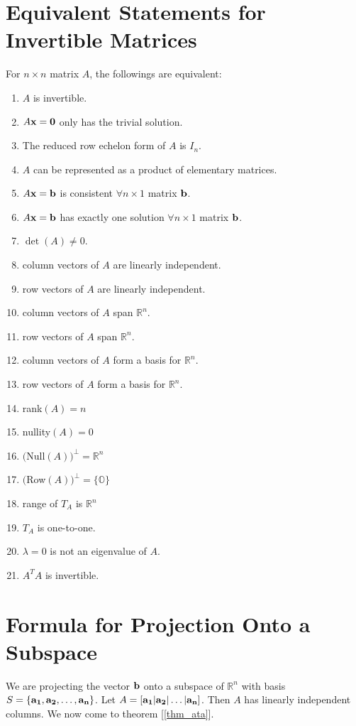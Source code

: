 

    \section{Equivalent Statements for Invertible Matrices}\label{equiv_invert}
    		For $n \times n$ matrix $A$, the followings are equivalent:
        \begin{enumerate}[label=(\alph*)]
        	\item $A$ is invertible.
        	\item $A\bf{x}=\bf{0}$ only has the trivial solution.
        	\item The reduced row echelon form of $A$ is $I_n$.
        	\item $A$ can be represented as a product of elementary matrices.
        	\item $A\bf{x}=\bf{b}$ is consistent $\forall n \times 1$ matrix $\bf{b}$.
        	\item $A\bf{x}=\bf{b}$ has exactly one solution $\forall n \times 1$ matrix $\bf{b}$.
        	\item $\det(A)\ne0$.
        	\item column vectors of $A$ are linearly independent.
        	\item row vectors of $A$ are linearly independent.
        	\item column vectors of $A$ span $\mathbb{R}^n$.
        	\item row vectors of $A$ span $\mathbb{R}^n$.
        	\item column vectors of $A$ form a basis for $\mathbb{R}^n$.
        	\item row vectors of $A$ form a basis for $\mathbb{R}^n$.
        	\item rank$(A)=n$
        	\item nullity$(A)=0$
        	\item $($Null$(A))^\perp=\mathbb{R}^n$
        	\item $($Row$(A))^\perp=\{\mathbb{O}\}$
        	\item range of $T_A$ is $\mathbb{R}^n$
        	\item $T_A$ is one-to-one.
        	\item $\lambda=0$ is not an eigenvalue of $A$.
        	\item $A^TA$ is invertible.
        \end{enumerate}
    
    \section{Formula for Projection Onto a Subspace}\label{fmla_proj_subspace}
    	We are projecting the vector $\bf{b}$ onto a subspace of $\mathbb{R}^n$ with basis $S=\{\bf{a_1},\bf{a_2},\dots,\bf{a_n}\}$. Let $A=[\bf{a_1}|\bf{a_2}|\dots|\bf{a_n}]$. Then $A$ has linearly independent columns. We now come to theorem [\ref{thm_ata}].
    	
